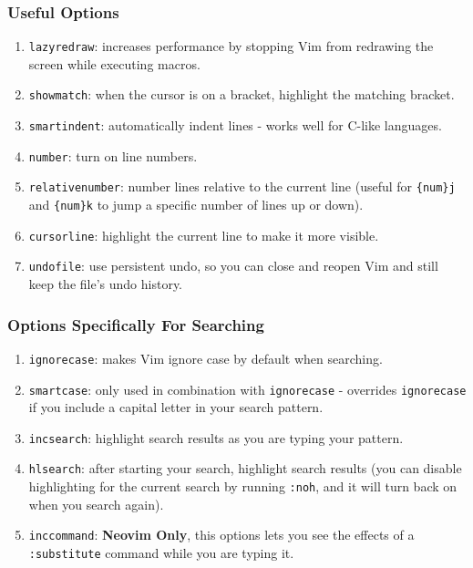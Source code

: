 \documentclass{beamer}
\begin{document}
\begin{frame}[fragile]
    \frametitle{Useful Options}
    \small
    \begin{enumerate}
	\item \verb+lazyredraw+: increases performance by stopping Vim from redrawing the screen while executing macros.
	\item \verb+showmatch+: when the cursor is on a bracket, highlight the matching bracket.
	\item \verb+smartindent+: automatically indent lines - works well for C-like languages.
	\item \verb+number+: turn on line numbers.
	\item \verb+relativenumber+: number lines relative to the current line (useful for \verb+{num}j+ and \verb+{num}k+ to jump a specific number of lines up or down).
	\item \verb+cursorline+: highlight the current line to make it more visible.
	\item \verb+undofile+: use persistent undo, so you can close and reopen Vim and still keep the file's undo history.
    \end{enumerate}
\end{frame}

\begin{frame}[fragile]
    \frametitle{Options Specifically For Searching}
    \small
    \begin{enumerate}
	\item \verb+ignorecase+: makes Vim ignore case by default when searching.
	\item \verb+smartcase+: only used in combination with \verb+ignorecase+ - overrides \verb+ignorecase+ if you include a capital letter in your search pattern.
	\item \verb+incsearch+: highlight search results as you are typing your pattern.
	\item \verb+hlsearch+: after starting your search, highlight search results (you can disable highlighting for the current search by running \verb+:noh+, and it will turn back on when you search again).
	\item \verb+inccommand+: \textbf{Neovim Only}, this options lets you see the effects of a \verb+:substitute+ command while you are typing it.
    \end{enumerate}
\end{frame}
\end{document}
